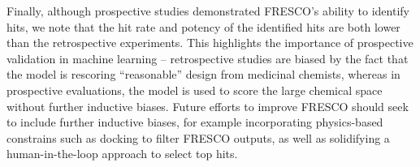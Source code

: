 Finally, although prospective studies demonstrated FRESCO's ability to identify hits, we note that the hit rate and potency of the identified hits are both lower than the retrospective experiments. This highlights the importance of prospective validation in machine learning -- retrospective studies are biased by the fact that the model is rescoring ``reasonable'' design from medicinal chemists, whereas in prospective evaluations, the model is used to score the large chemical space without further inductive biases. Future efforts to improve FRESCO should seek to include further inductive biases, for example incorporating physics-based constrains such as docking to filter FRESCO outputs, as well as solidifying a human-in-the-loop approach to select top hits. 


